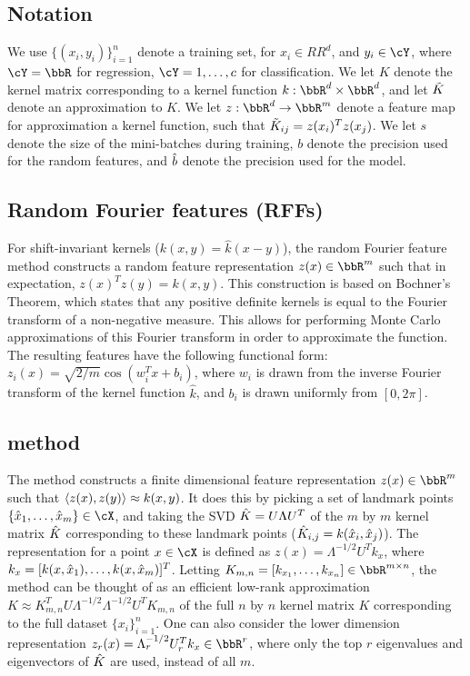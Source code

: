 \subsection{Notation}
We use $\{(x_i,y_i)\}_{i=1}^n$ denote a training set, for $x_i \in RR^d$, and $y_i \in \cY$, where $\cY = \RR$ for regression, $\cY = {1,\ldots,c}$ for classification.  We let $K$ denote the kernel matrix corresponding to a kernel function $k:\RR^d\times\RR^d$, and let $\tilde{K}$ denote an approximation to $K$. We let $z:\RR^d\rightarrow\RR^m$ denote a feature map for approximation a kernel function, such that $\tilde{K}_{ij} = z(x_i)^T z(x_j)$.  We let $s$ denote the size of the mini-batches during training, $b$ denote the precision used for the random features, and $\hat{b}$ denote the precision used for the model.

\subsection{Random Fourier features (RFFs)}
For shift-invariant kernels ($k(x,y) = \hat{k}(x-y)$), the random Fourier 
feature method \citep{rahimi07random} constructs a random feature representation 
$z(x) \in \RR^m$ such that in expectation, $z(x)^T z(y) = k(x,y)$. This construction 
is based on Bochner's Theorem, which states that any positive definite kernels is 
equal to the Fourier transform of a non-negative measure. This allows for performing
Monte Carlo approximations of this Fourier transform in order to approximate the 
function.  The resulting features have the following functional form: 
$z_i(x) = \sqrt{2/m}\cos(w_i^Tx + b_i)$, where $w_i$ is drawn from the inverse Fourier
transform of the kernel function $\hat{k}$, and $b_i$ is drawn uniformly from $[0,2\pi]$. 


\subsection{\Nystrom method}
The \Nystrom method constructs a finite dimensional feature representation
$z(x) \in \RR^m$ such that $\left\langle z(x),z(y)\right\rangle \approx k(x,y)$.  It does this
by picking a set of landmark points $\{\hx_1,\ldots,\hx_m\} \in \cX$,
and taking the SVD $\hat{K} = U\Lambda U^T$ of the $m$ by $m$ 
kernel matrix $\hat{K}$ corresponding to these landmark points 
($\hat{K}_{i,j} = k(\hat{x}_i,\hat{x}_j)$).  The \Nystrom representation for a point $x \in \cX$
is defined as $z(x) = \Lambda^{-1/2} U^T k_x$, where $k_x = [k(x,\hat{x}_1),\ldots,k(x,\hat{x}_m)]^T$.
Letting $K_{m,n} = [k_{x_1},\ldots,k_{x_n}] \in \RR^{m\times n}$, 
the \Nystrom method can be thought of as an efficient low-rank approximation
$K \approx K_{m,n}^T U \Lambda^{-1/2}\Lambda^{-1/2} U^T K_{m,n}$ of the full
$n$ by $n$ kernel matrix $K$ corresponding to the full dataset $\{x_i\}_{i=1}^n$.
One can also consider the lower dimension \Nystrom representation
$z_r(x) = \Lambda_r^{-1/2} U_r^T k_x \in \RR^r$, where only the top $r$ eigenvalues and
eigenvectors of $\hat{K}$ are used, instead of all $m$.

